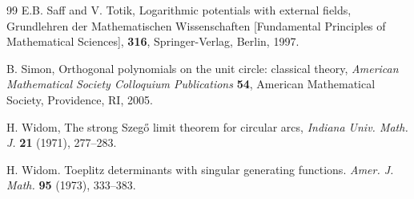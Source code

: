 \documentclass[11pt,fleqn]{article}
\numberwithin{equation}{section}
\begin{document}
\begin{thebibliography}{99}
 E.B. Saff and V. Totik,
Logarithmic potentials with external fields,
{Grundlehren der Mathematischen Wissenschaften [Fundamental
              Principles of Mathematical Sciences]},
    {\bf 316}, Springer-Verlag, Berlin, 1997.

 B. Simon, Orthogonal polynomials on the unit circle: classical theory, {\em American Mathematical Society Colloquium Publications} {\bf 54}, American Mathematical Society, Providence, RI, 2005.


 H. Widom, The strong Szeg\H{o} limit theorem for circular arcs, {\em Indiana Univ. Math. J.} {\bf 21}
(1971), 277--283.

 H. Widom. Toeplitz determinants with singular generating
functions. {\em Amer. J. Math.} {\bf 95} (1973), 333--383.
\end{thebibliography}
\end{document}
